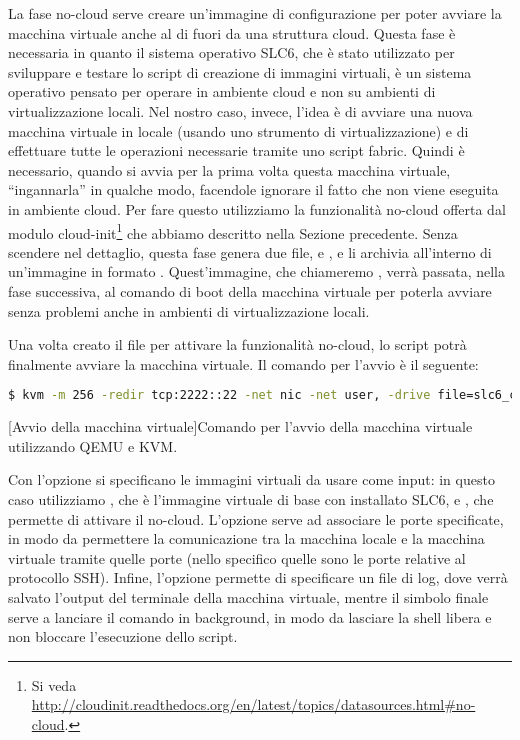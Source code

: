             La fase no-cloud serve creare un'immagine  di configurazione per poter avviare la macchina virtuale anche al di fuori da una struttura cloud. Questa fase è necessaria in quanto il sistema operativo \ac{SLC6}, che è stato utilizzato per sviluppare e testare lo script di creazione di immagini virtuali, è un sistema operativo pensato per operare in ambiente cloud e non su ambienti di virtualizzazione locali. Nel nostro caso, invece, l'idea è di avviare una nuova macchina virtuale in locale (usando uno strumento di virtualizzazione) e di effettuare tutte le operazioni necessarie tramite uno script fabric. Quindi è necessario, quando si avvia per la prima volta questa macchina virtuale, ``ingannarla'' in qualche modo, facendole ignorare il fatto che non viene eseguita in ambiente cloud. Per fare questo utilizziamo la funzionalità no-cloud offerta dal modulo cloud-init\footnote{Si veda \url{http://cloudinit.readthedocs.org/en/latest/topics/datasources.html\#no-cloud}.} che abbiamo descritto nella Sezione precedente. Senza scendere nel dettaglio, questa fase genera due file,  e , e li archivia all'interno di un'immagine in formato . Quest'immagine, che chiameremo , verrà passata, nella fase successiva, al comando di boot della macchina virtuale per poterla avviare senza problemi anche in ambienti di virtualizzazione locali.
            
            Una volta creato il file  per attivare la funzionalità no-cloud, lo script potrà finalmente avviare la macchina virtuale. Il comando per l'avvio è il seguente:
            
            \begin{center}
                \begin{lstlisting}[language=bash, gobble=18]
                    $ kvm -m 256 -redir tcp:2222::22 -net nic -net user, -drive file=slc6_cern_x86_64.qcow2,if=virtio -drive file=init.iso,if=virtio -serial file:qemu-output.log &
                \end{lstlisting}
                \captionsetup{textformat=empty,labelformat=empty} \vspace{-2em}
                [Avvio della macchina virtuale]{Comando per l'avvio della macchina virtuale utilizzando \ac{QEMU} e \ac{KVM}.}
            \end{center}
            
            Con l'opzione  si specificano le immagini virtuali da usare come input: in questo caso utilizziamo , che è l'immagine virtuale di base con installato \ac{SLC6}, e , che permette di attivare il no-cloud. L'opzione  serve ad associare le porte specificate, in modo da permettere la comunicazione tra la macchina locale e la macchina virtuale tramite quelle porte (nello specifico quelle sono le porte relative al protocollo \ac{SSH}). Infine, l'opzione  permette di specificare un file di log, dove verrà salvato l'output del terminale della macchina virtuale, mentre il simbolo \bash{&} finale serve a lanciare il comando in background, in modo da lasciare la shell libera e non bloccare l'esecuzione dello script.
            
